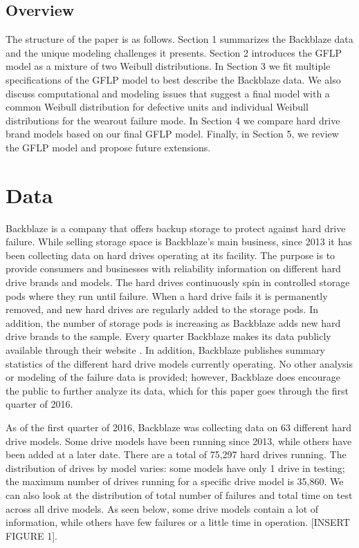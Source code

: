\documentclass[12pt]{article}
\begin{document}
\subsection{Overview}
The structure of the paper is as follows.  Section 1 summarizes the Backblaze data and the unique modeling challenges it presents.  Section 2 introduces the GFLP model as a mixture of two Weibull distributions.  In Section 3 we fit multiple specifications of the GFLP model to best describe the Backblaze data.  We also discuss computational and modeling issues that suggest a final model with a common Weibull distribution for defective units and individual Weibull distributions for the wearout failure mode.  In Section 4 we compare hard drive brand models based on our final GFLP model.  Finally, in Section 5, we review the GFLP model and propose future extensions.

\section{Data}
Backblaze is a company that offers backup storage to protect against hard drive failure.  While selling storage space is Backblaze's main business, since 2013 it has been collecting data on hard drives operating at its facility.  The purpose is to provide consumers and businesses with reliability information on different hard drive brands and models.  The hard drives continuously spin in controlled storage pods where they run until failure.  When a hard drive fails it is permanently removed, and new hard drives are regularly added to the storage pods.  In addition, the number of storage pods is increasing as Backblaze adds new hard drive brands to the sample.  Every quarter Backblaze makes its data publicly available through their website \cite{backblaze}. In addition, Backblaze publishes summary statistics of the different hard drive models currently operating.  No other analysis or modeling of the failure data is provided; however, Backblaze does encourage the public to further analyze its data, which for this paper goes through the first quarter of 2016.

As of the first quarter of 2016, Backblaze was collecting data on 63 different hard drive models.  Some drive models have been running since 2013, while others have been added at a later date.  There are a total of 75,297 hard drives running.  The distribution of drives by model varies: some models have only 1 drive in testing; the maximum number of drives running for a specific drive model is 35,860.  We can also look at the distribution of total number of failures and total time on test across all drive models.  As seen below, some drive models contain a lot of information, while others have few failures or a little time in operation. [INSERT FIGURE 1]. \\
\end{document}
